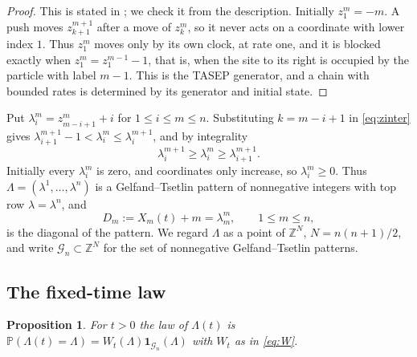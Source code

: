 \documentclass[11pt]{amsart}
\newtheorem{proposition}[theorem]{Proposition}
\theoremstyle{remark}
\numberwithin{equation}{section}
\newcommand{\Pp}{\mathbb P}
\newcommand{\1}{\mathbf 1}
\newcommand{\Z}{\mathbb Z}
\begin{document}
\begin{proof}
This is stated in \cite[Section~1.1]{BF}; we check it from the description. Initially $z^m_1=-m$. A push moves $z^{m+1}_{k+1}$ after a move of $z^m_k$, so it never acts on a coordinate with lower index $1$. Thus $z^m_1$ moves only by its own clock, at rate one, and it is blocked exactly when $z^m_1=z^{m-1}_1-1$, that is, when the site to its right is occupied by the particle with label $m-1$. This is the TASEP generator, and a chain with bounded rates is determined by its generator and initial state.
\end{proof}

Put $\lambda^m_i=z^m_{m-i+1}+i$ for $1\le i\le m\le n$. Substituting $k=m-i+1$ in \eqref{eq:zinter} gives $\lambda^{m+1}_{i+1}-1<\lambda^m_i\le\lambda^{m+1}_i$, and by integrality
\begin{equation}\label{eq:GT}
\lambda^{m+1}_i\ge\lambda^m_i\ge\lambda^{m+1}_{i+1}.
\end{equation}
Initially every $\lambda^m_i$ is zero, and coordinates only increase, so $\lambda^m_i\ge0$. Thus $\Lambda=(\lambda^1,\dots,\lambda^n)$ is a Gelfand--Tsetlin pattern of nonnegative integers with top row $\lambda=\lambda^n$, and
\[
D_m:=X_m(t)+m=\lambda^m_m,\qquad 1\le m\le n,
\]
is the diagonal of the pattern. We regard $\Lambda$ as a point of $\Z^N$, $N=n(n+1)/2$, and write $\mathcal G_n\subset\Z^N$ for the set of nonnegative Gelfand--Tsetlin patterns.

\subsection{The fixed-time law}

\begin{proposition}\label{prop:law}
For $t>0$ the law of $\Lambda(t)$ is $\Pp(\Lambda(t)=\Lambda)=W_t(\Lambda)\1_{\mathcal G_n}(\Lambda)$ with $W_t$ as in \eqref{eq:W}.
\end{proposition}
\end{document}
